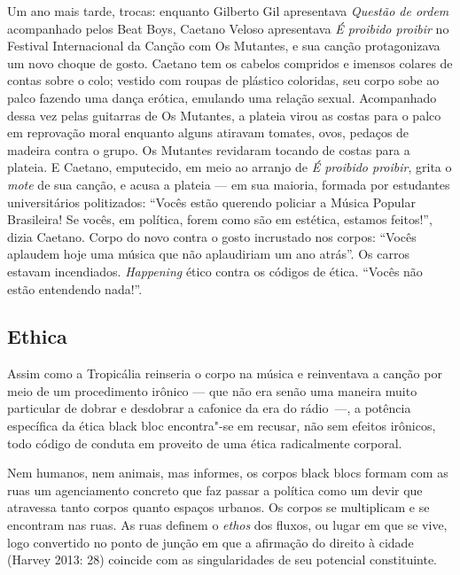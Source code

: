 Um ano mais tarde, trocas: enquanto Gilberto Gil apresentava
\emph{Questão de ordem }acompanhado pelos Beat Boys, Caetano\emph{
}Veloso apresentava \emph{É proibido proibir} no  Festival
Internacional da Canção com Os Mutantes, e sua canção protagonizava um
novo choque de gosto. Caetano tem os cabelos compridos e imensos colares
de contas sobre o colo; vestido com roupas de plástico coloridas, seu
corpo sobe ao palco fazendo uma dança erótica, emulando uma relação
sexual. Acompanhado dessa vez pelas guitarras de Os Mutantes, a plateia
virou as costas para o palco em reprovação moral enquanto alguns
atiravam tomates, ovos, pedaços de madeira contra o grupo. Os Mutantes
revidaram tocando de costas para a plateia. E Caetano, emputecido, em
meio ao arranjo de \emph{É proibido proibir}, grita o \emph{mote }de sua
canção, e acusa a plateia --- em sua maioria, formada por estudantes
universitários politizados: ``Vocês estão querendo policiar a Música
Popular Brasileira! Se vocês, em política, forem como são em estética,
estamos feitos!'', dizia Caetano. Corpo do novo contra o gosto
incrustado nos corpos: ``Vocês aplaudem hoje uma música que não
aplaudiriam um ano atrás''. Os carros estavam incendiados.
\emph{Happening }ético contra os códigos de ética. ``Vocês não estão
entendendo nada!''.

\subsection{Ethica}

Assim como a Tropicália reinseria o corpo na música e
reinventava a canção por meio de um procedimento irônico --- que não era
senão uma maneira muito particular de dobrar e desdobrar a cafonice da
era do rádio~---, a potência específica da ética black bloc encontra"-se
em recusar, não sem efeitos irônicos, todo código de conduta em proveito
de uma ética radicalmente corporal.

Nem humanos, nem animais, mas informes, os corpos black blocs formam com
as ruas um agenciamento concreto que faz passar a política como um devir
que atravessa tanto corpos quanto espaços urbanos. Os corpos se
multiplicam e se encontram nas ruas. As ruas definem o \emph{ethos }dos
fluxos, ou lugar em que se vive, logo convertido no ponto de junção em
que a afirmação do direito à cidade (Harvey 2013: 28) coincide com as
singularidades de seu potencial constituinte.

